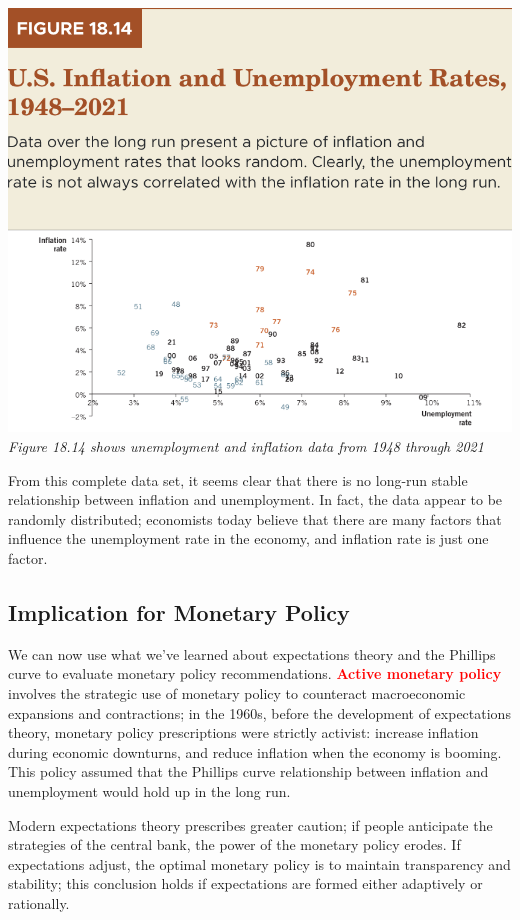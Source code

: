 \documentclass[11pt]{article} %
\begin{document}
\begin{center}
\includegraphics[scale=0.5]{images/Figure 18.14.png}\\
\textit{Figure 18.14 shows unemployment and inflation data from 1948 through 2021}
\end{center}
From this complete data set, it seems clear that there is no long-run stable relationship between inflation and unemployment. In fact, the data appear to be randomly distributed; economists today believe that there are many factors that influence the unemployment rate in the economy, and inflation rate is just one factor.

\subsection*{Implication for Monetary Policy}
We can now use what we've learned about expectations theory and the Phillips curve to evaluate monetary policy recommendations. \textbf{\textcolor{red}{Active monetary policy}} involves the strategic use of monetary policy to counteract macroeconomic expansions and contractions; in the 1960s, before the development of expectations theory, monetary policy prescriptions were strictly activist: increase inflation during economic downturns, and reduce inflation when the economy is booming. This policy assumed that the Phillips curve relationship between inflation and unemployment would hold up in the long run.

Modern expectations theory prescribes greater caution; if people anticipate the strategies of the central bank, the power of the monetary policy erodes. If expectations adjust, the optimal monetary policy is to maintain transparency and stability; this conclusion holds if expectations are formed either adaptively or rationally.
\end{document}
